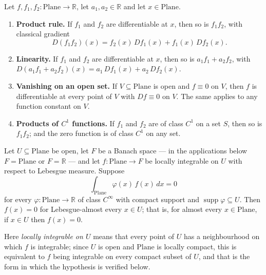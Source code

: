 \begin{proposition}
Let $f,f_1,f_2\colon\mathrm{Plane}\to\mathbb{R}$, let $a_1,a_2\in\mathbb{R}$ and let
$x\in\mathrm{Plane}$.
\begin{enumerate}
\item \textbf{Product rule.}  If $f_1$ and $f_2$ are differentiable at $x$, then so is
$f_1f_2$, with classical gradient
\[
  D(f_1f_2)(x)=f_2(x)\,Df_1(x)+f_1(x)\,Df_2(x).
\]
\item \textbf{Linearity.}  If $f_1$ and $f_2$ are differentiable at $x$, then so is
$a_1f_1+a_2f_2$, with $D(a_1f_1+a_2f_2)(x)=a_1\,Df_1(x)+a_2\,Df_2(x)$.
\item \textbf{Vanishing on an open set.}  If $V\subseteq\mathrm{Plane}$ is open and $f\equiv0$
on $V$, then $f$ is differentiable at every point of $V$ with $Df\equiv0$ on $V$.  The same
applies to any function constant on $V$.
\item \textbf{Products of $C^1$ functions.}  If $f_1$ and $f_2$ are of class $C^{1}$ on a set
$S$, then so is $f_1f_2$; and the zero function is of class $C^{1}$ on any set.
\end{enumerate}
\end{proposition}

\begin{proposition}
Let $U\subseteq\mathrm{Plane}$ be open, let $F$ be a Banach space --- in the applications below
$F=\mathrm{Plane}$ or $F=\mathbb{R}$ --- and let $f\colon\mathrm{Plane}\to F$ be locally
integrable on $U$ with respect to Lebesgue measure.  Suppose
\[
  \int_{\mathrm{Plane}}\varphi(x)\,f(x)\,dx=0
\]
for every $\varphi\colon\mathrm{Plane}\to\mathbb{R}$ of class $C^\infty$ with compact support
and $\operatorname{supp}\varphi\subseteq U$.  Then $f(x)=0$ for Lebesgue-almost every $x\in U$;
that is, for almost every $x\in\mathrm{Plane}$, if $x\in U$ then $f(x)=0$.

Here \emph{locally integrable on $U$} means that every point of $U$ has a neighbourhood on
which $f$ is integrable; since $U$ is open and $\mathrm{Plane}$ is locally compact, this is
equivalent to $f$ being integrable on every compact subset of $U$, and that is the form in
which the hypothesis is verified below.
\end{proposition}

